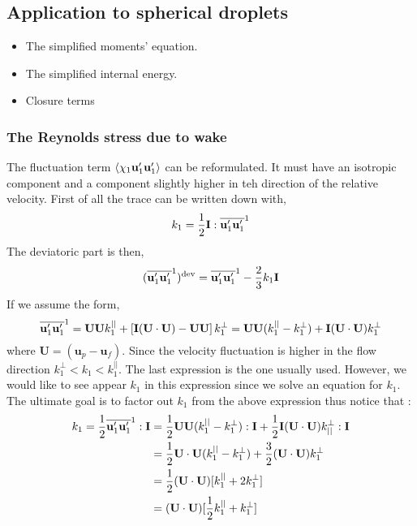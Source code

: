 
\subsection{Application to spherical droplets}


\begin{itemize}
    \item The simplified moments' equation.
    \item The simplified internal energy. 
    \item Closure terms
\end{itemize}

\subsubsection{The Reynolds stress due to wake}
The fluctuation term $\left<\chi_1 \textbf{u}_1'\textbf{u}_1'\right>$ can be reformulated. 
It must have an isotropic component and a component slightly higher in teh direction of the relative velocity.  
First of all the trace can be written down with, 
\begin{equation*}
    k_1=
    \frac{1}{2}\textbf{I}:\overline{\textbf{u}_1'\textbf{u}_1'}^1
\end{equation*}
The deviatoric part is then, 
\begin{equation*}
    (\overline{\textbf{u}_1'\textbf{u}_1'}^1)^\text{dev}=
    \overline{\textbf{u}_1'\textbf{u}_1'}^1
    - \frac{2}{3}k_1\textbf{I}
\end{equation*}
If we assume the form, 
\begin{equation*}
    \overline{\textbf{u}_1'\textbf{u}_1'}^1
    = 
    \textbf{U}
    \textbf{U}
    k^{||}_1
    + 
    \left[
        \textbf{I} (\textbf{U}\cdot \textbf{U})
    -
    \textbf{U}
    \textbf{U}
    \right]
    k^{\bot}_1
    = 
    \textbf{U}
    \textbf{U}
    (k^{||}_1 - k^{\bot}_1)
    + \textbf{I} (\textbf{U}\cdot\textbf{U}) k^\bot_1
\end{equation*}
where $\textbf{U} = (\textbf{u}_p - \textbf{u}_f)$. 
Since the velocity fluctuation is higher in the flow direction $k^\bot_1 < k_1 < k^{||}_1$. 
The last expression is the one usually used. 
However, we would like to see appear $k_1$ in this expression since we solve an equation for $k_1$.  
The ultimate goal is to factor out $k_1$ from the above expression thus notice that :
\begin{align*}
    k_1 =
    \frac{1}{2} \overline{\textbf{u}_1'\textbf{u}_1'}^1 : \textbf{I}
    &= 
    \frac{1}{2} \textbf{U}
    \textbf{U}
    (k^{||}_1 - k^{\bot}_1) : \textbf{I}
    + \frac{1}{2} \textbf{I} (\textbf{U}\cdot\textbf{U}) k^\bot_{||} : \textbf{I}\\
    &= 
    \frac{1}{2} 
    \textbf{U}\cdot 
    \textbf{U}
    (k^{||}_1 - k^{\bot}_1)
    + \frac{3}{2}  (\textbf{U}\cdot\textbf{U}) k^\bot_1 \\
    &= 
    \frac{1}{2} 
    (\textbf{U}\cdot 
    \textbf{U})[
        k^{||}_1 
        + 2 k^\bot_1
    ]\\
    &= 
    (\textbf{U}\cdot 
    \textbf{U})[
        \frac{1}{2}k^{||}_1 
        + k^\bot_1
    ]
\end{align*}
